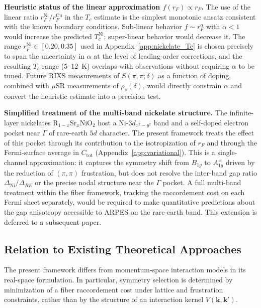     \textbf{Heuristic status of the linear approximation $f(r_F) \propto r_F$.}
    The use of the linear ratio $r_F^\textrm{Ni}/r_F^\textrm{Cu}$ in the $T_c$ estimate is the
    simplest monotonic ansatz consistent with the known boundary conditions.
    Sub-linear behavior $f \sim r_F^\alpha$ with $\alpha < 1$ would increase the predicted
    $T_c^\textrm{Ni}$; super-linear behavior would decrease it.
    The range $r_F^\textrm{Ni} \in [0.20, 0.35]$ used in Appendix~\ref{app:nickelate_Tc}
    is chosen precisely to span the uncertainty in $\alpha$ at the level of leading-order
    corrections, and the resulting $T_c$ range (5--12~K) overlaps with observations
    without requiring $\alpha$ to be tuned.
    Future RIXS measurements of $S(\pi,\pi;\delta)$ as a function of doping, combined
    with $\mu$SR measurements of $\rho_s(\delta)$, would directly constrain $\alpha$
    and convert the heuristic estimate into a precision test.

    \textbf{Simplified treatment of the multi-band nickelate structure.}
    The infinite-layer nickelates R$_{1-x}$Sr$_x$NiO$_2$ host a Ni-$3d_{x^2-y^2}$
    band and a self-doped electron pocket near $\Gamma$ of rare-earth $5d$ character.
    The present framework treats the effect of this pocket through its contribution to
    the isotropization of $r_F$ and through the Fermi-surface average in $C_\textrm{tot}$
    (Appendix~\ref{app:variational}).
    This is a single-channel approximation: it captures the symmetry shift from $B_{1g}$
    to $A_{1g}^\pm$ driven by the reduction of $(\pi,\pi)$ frustration, but does not
    resolve the inter-band gap ratio $\Delta_\textrm{Ni}/\Delta_{RE}$ or the precise
    nodal structure near the $\Gamma$ pocket.
    A full multi-band treatment within the fiber framework, tracking the raccordement
    cost on each Fermi sheet separately, would be required to make quantitative predictions
    about the gap anisotropy accessible to ARPES on the rare-earth band.
    This extension is deferred to a subsequent paper.

  \subsection{Relation to Existing Theoretical Approaches}
    \label{subsec:relation-existing}

    The present framework differs from
    momentum-space interaction models
    in its real-space formulation.
    In particular,
    symmetry selection is determined
    by minimization of a fiber raccordement cost
    under lattice and frustration constraints,
    rather than by the structure of an interaction kernel
    $V(\mathbf{k},\mathbf{k}')$.

